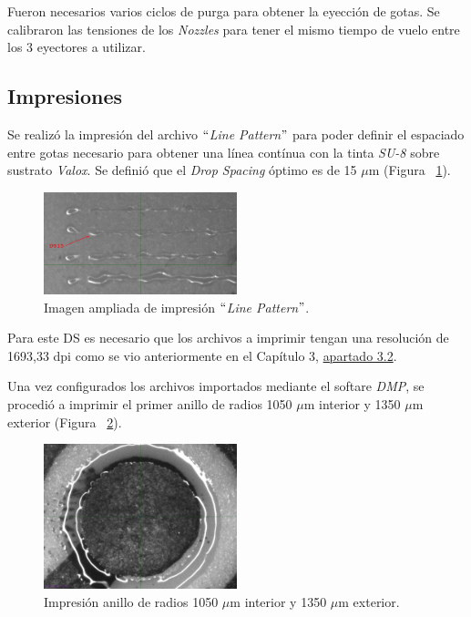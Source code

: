 Fueron necesarios varios ciclos de purga para obtener la eyección de gotas. Se calibraron las tensiones de los \textit{Nozzles} para tener el mismo tiempo de vuelo entre los 3 eyectores a utilizar.

\subsection{Impresiones}
Se realizó la impresión del archivo $``$\textit{Line Pattern}$"$ para poder definir el espaciado entre gotas necesario para obtener una línea contínua con la tinta \textit{SU-8} sobre sustrato \textit{Valox}. Se definió que el \textit{Drop Spacing} óptimo es de 15 $\mu$m (Figura ~\ref{fig:Figura_LinePattern_SU8}).

\begin{figure}[H]
  \centering
    \includegraphics[width=0.5\textwidth]{Figuras/Figura_LinePattern_SU8}
  \caption{Imagen ampliada de impresión $``$\textit{Line Pattern}$"$.}
  \label{fig:Figura_LinePattern_SU8}
\end{figure}

Para este DS es necesario que los archivos a imprimir tengan una resolución de 1693,33 dpi como se vio anteriormente en el Capítulo 3, \hyperref[sec:calib_impresora]{apartado 3.2}.

Una vez configurados los archivos importados mediante el softare \textit{DMP}, se procedió a imprimir el primer anillo de radios 1050 $\mu$m interior y 1350 $\mu$m exterior (Figura ~\ref{fig:Figura_Anillo105a135_SU8}).

\begin{figure}[H]
  \centering
    \includegraphics[width=0.5\textwidth]{Figuras/Figura_Anillo105a135_SU8}
  \caption{Impresión anillo de radios 1050 $\mu$m interior y 1350 $\mu$m exterior.}
  \label{fig:Figura_Anillo105a135_SU8}
\end{figure}

